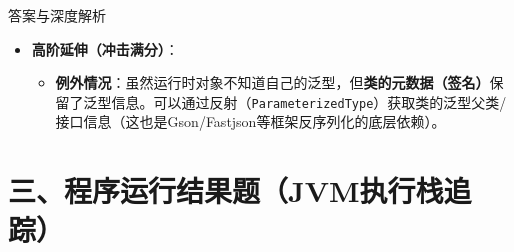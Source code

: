\documentclass[12pt, a4paper]{ctexart}
\begin{document}
\begin{enumerate}[label=\textbf{\arabic*.}]
\begin{bluebox}{答案与深度解析}
\begin{itemize}[leftmargin=*, nosep]
			      \item \textbf{高阶延伸（冲击满分）}：
			            \begin{itemize}
				            \item \textbf{例外情况}：虽然运行时对象不知道自己的泛型，但\textbf{类的元数据（签名）}保留了泛型信息。可以通过反射（\texttt{ParameterizedType}）获取类的泛型父类/接口信息（这也是Gson/Fastjson等框架反序列化的底层依赖）。
			            \end{itemize}
		      \end{itemize}
	      \end{bluebox}

\end{enumerate}

\newpage
\section{三、程序运行结果题（JVM执行栈追踪）}
\end{document}
